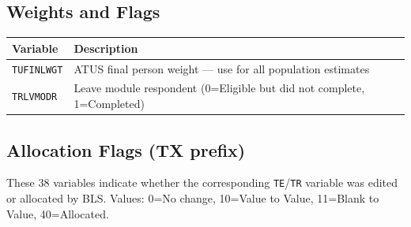\documentclass[11pt, a4paper]{article}
\begin{document}
\subsection{Weights and Flags}
\begin{longtable}{L{3.8cm} L{12cm}}
\toprule \textbf{Variable} & \textbf{Description} \\ \midrule \endhead
\bottomrule \endfoot
\texttt{TUFINLWGT} & ATUS final person weight --- use for all population estimates \\
 \texttt{TRLVMODR}  & Leave module respondent (0=Eligible but did not complete,
                     1=Completed) \\
\end{longtable}

\subsection{Allocation Flags (TX prefix)}

\begin{tcolorbox}[notebox]
\small These 38 variables indicate whether the corresponding \texttt{TE}/\texttt{TR}
variable was edited or allocated by BLS.
Values: 0=No change, 10=Value to Value, 11=Blank to Value, 40=Allocated.
\end{tcolorbox}
\end{document}
